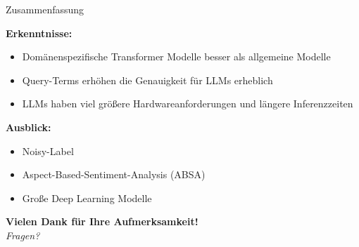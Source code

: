 \documentclass[aspectratio=169]{beamer} %
\begin{document}
\begin{frame}{Zusammenfassung}
  \normalsize
      \item \textbf{Erkenntnisse:}
      \begin{itemize}
          \item Domänenspezifische Transformer Modelle besser als allgemeine Modelle
          \item Query-Terms erhöhen die Genauigkeit für LLMs erheblich
          \item LLMs haben viel größere Hardwareanforderungen und längere Inferenzzeiten
      \end{itemize}
      \vspace{0.4cm}
      \textbf{Ausblick:}
      \begin{itemize}
          \item Noisy-Label
          \item Aspect-Based-Sentiment-Analysis (ABSA)
          \item Große Deep Learning Modelle
      \end{itemize}

  \vspace{0.5cm}
  \centering
  \pause
  {\large \textbf{Vielen Dank für Ihre Aufmerksamkeit!}} \\[0.1cm]
  \textit{Fragen?}
\end{frame}
\end{document}
